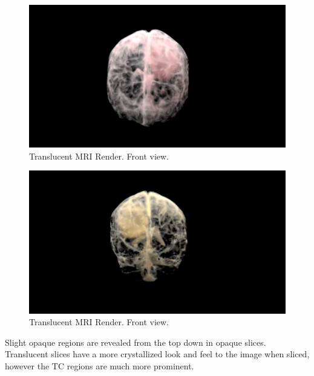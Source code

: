 \begin{figure}[h]
 \centering %
 \includegraphics[width=\columnwidth]{pictures/bt-alphared-front.png}
 \caption{Translucent MRI Render. Front view.}
 \label{fig:alphared-front}
\end{figure}

\begin{figure}[h]
 \centering %
 \includegraphics[width=\columnwidth]{pictures/bt-alphalimon-back.png}
 \caption{Translucent MRI Render. Front view.}
 \label{fig:alphared-front}
\end{figure}

Slight opaque regions are revealed from the top down in opaque slices. Translucent slices have a more crystallized look and feel to the image when sliced, however the TC regions are much more prominent.

